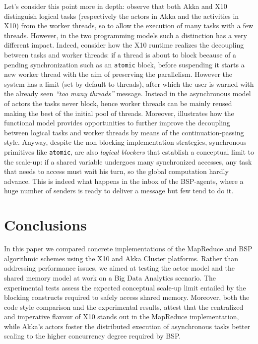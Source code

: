 \documentclass[a4paper]{article}
\numberwithin{equation}{section}
\begin{document}
Let's consider this point more in depth: observe that both Akka and
X10 distinguish logical tasks (respectively the actors in Akka and the
activities in X10) from the worker threads, so to allow the execution
of many tasks with a few threads. 
However, in the two programming models such a distinction has a very
different impact. 
Indeed, consider how the X10 runtime realizes the decoupling between
tasks and worker threads: if a thread is about to block because of a
pending synchronization such as an \verb+atomic+ block, 
before suspending it starts a new worker thread with the aim of
preserving the parallelism. However the system has a limit (set by
default to  threads), after which the user is warned with the
already seen \emph{``too many threads''} message. 
Instead in the asynchronous model of actors the
tasks never block, hence worker threads can be mainly reused making
the best of the initial pool of threads. 
Moreover, \cite{OderskyHaller09}
illustrates how the functional model provides 
opportunities  to further
improve the decoupling between logical tasks and worker threads
by means of the continuation-passing style.
Anyway, despite the non-blocking implementation strategies, 
synchronous primitives like \verb+atomic+, 
are also \emph{logical blockers} that establish a conceptual
limit to the scale-up:
if a shared variable undergoes many synchronized accesses,
any task that needs to access must wait his turn, so the global
computation hardly advance. 
This is indeed what happens in the inbox of the BSP-agents, 
where a huge number of senders is ready
to deliver a message but few tend to do it.
 


\section{Conclusions}
\label{sec:conclusions}
In this paper we compared concrete implementations of the MapReduce
and BSP algorithmic schemes using the X10 and Akka Cluster platforms.
Rather than addressing performance issues, we aimed at testing the
actor model and the shared memory model at work on a Big Data
Analytics scenario. The experimental tests assess the expected
conceptual scale-up limit entailed by the blocking constructs required
to safely access shared memory.
Moreover, both the code style comparison and the
experimental results, attest that the centralized and imperative
flavour of X10 stands out in the MapReduce implementation, while
Akka's actors foster the distributed execution of asynchronous tasks
better scaling to the higher concurrency degree required by BSP.
\end{document}
